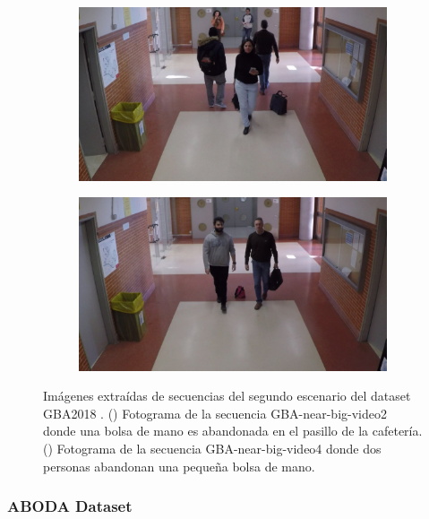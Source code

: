 \begin{figure}[ht]
  \centering
  \begin{subfigure}[b]{0.4\textwidth}
    \includegraphics[width=\textwidth]{img/chapters/resultados/datasets/GBA_3.jpg}
    \caption{}
    \label{fig:GBA_3}
  \end{subfigure}
  \qquad\qquad
  \begin{subfigure}[b]{0.4\textwidth}
    \includegraphics[width=\textwidth]{img/chapters/resultados/datasets/GBA_4.jpg}
    \caption{}
    \label{fig:GBA_4}
  \end{subfigure}
  \caption{Imágenes extraídas de secuencias del segundo escenario del dataset GBA2018 \cite{gba-dataset}.
    (\protect{}) Fotograma de la secuencia GBA-near-big-video2 donde una bolsa de mano es abandonada en el pasillo de la cafetería.
    (\protect{}) Fotograma de la secuencia GBA-near-big-video4 donde dos personas abandonan una pequeña bolsa de mano.}
  \label{fig:GBA2}
\end{figure}

\subsubsection{ABODA Dataset}

